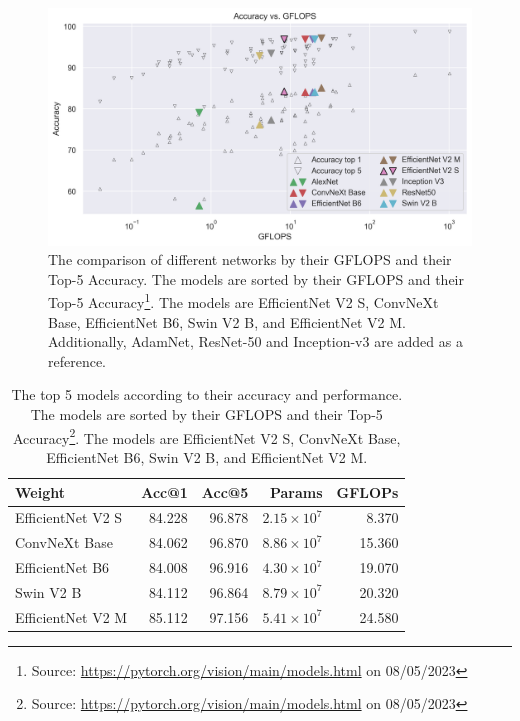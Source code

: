 \begin{figure}[ht]
  \centering
  \includegraphics[width=\linewidth]{figures/network/networks.png}
  \caption[Network comparison]{The comparison of different networks by their GFLOPS and their Top-5 Accuracy. The models are sorted by their GFLOPS and their Top-5 Accuracy\footnote{Source: \url{https://pytorch.org/vision/main/models.html} on 08/05/2023}. The models are EfficientNet V2 S, ConvNeXt Base, EfficientNet B6, Swin V2 B, and EfficientNet V2 M. Additionally, AdamNet, ResNet-50 and Inception-v3 are added as a reference.}
  \label{fig:network_comparison}
\end{figure}

\begin{table}[ht]
  \caption[Top 5 models for Accuracy and Performance]{The top 5 models according to their accuracy and performance. The models are sorted by their GFLOPS and their Top-5 Accuracy\footnote{Source: \url{https://pytorch.org/vision/main/models.html} on 08/05/2023}. The models are EfficientNet V2 S, ConvNeXt Base, EfficientNet B6, Swin V2 B, and EfficientNet V2 M.}
  \label{tab:network_comparison}
  \centering
  \begin{tabular}{lrrrr}
    \hline
            Weight &  Acc@1 &  Acc@5 &   Params &  GFLOPs \\
    \hline
  EfficientNet V2 S & 84.228 & 96.878 & $2.15 \times 10^7$ &   8.370 \\
      ConvNeXt Base & 84.062 & 96.870 & $8.86 \times 10^7$ &  15.360 \\
    EfficientNet B6 & 84.008 & 96.916 & $4.30 \times 10^7$ &  19.070 \\
          Swin V2 B & 84.112 & 96.864 & $8.79 \times 10^7$ &  20.320 \\
  EfficientNet V2 M & 85.112 & 97.156 & $5.41 \times 10^7$ &  24.580 \\
  \hline
  \end{tabular}
\end{table}

